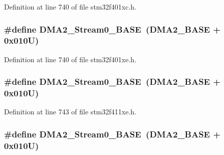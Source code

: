 Definition at line 740 of file stm32f401xc.\+h.

\subsubsection[{\texorpdfstring{D\+M\+A2\+\_\+\+Stream0\+\_\+\+B\+A\+SE}{DMA2_Stream0_BASE}}]{\setlength{\rightskip}{0pt plus 5cm}\#define D\+M\+A2\+\_\+\+Stream0\+\_\+\+B\+A\+SE~({\bf D\+M\+A2\+\_\+\+B\+A\+SE} + 0x010\+U)}\hypertarget{group___peripheral__registers__structures_gac4c67b24726ba6b94d03adb351bcec4d}{}\label{group___peripheral__registers__structures_gac4c67b24726ba6b94d03adb351bcec4d}


Definition at line 740 of file stm32f401xe.\+h.

\subsubsection[{\texorpdfstring{D\+M\+A2\+\_\+\+Stream0\+\_\+\+B\+A\+SE}{DMA2_Stream0_BASE}}]{\setlength{\rightskip}{0pt plus 5cm}\#define D\+M\+A2\+\_\+\+Stream0\+\_\+\+B\+A\+SE~({\bf D\+M\+A2\+\_\+\+B\+A\+SE} + 0x010\+U)}\hypertarget{group___peripheral__registers__structures_gac4c67b24726ba6b94d03adb351bcec4d}{}\label{group___peripheral__registers__structures_gac4c67b24726ba6b94d03adb351bcec4d}


Definition at line 743 of file stm32f411xe.\+h.

\subsubsection[{\texorpdfstring{D\+M\+A2\+\_\+\+Stream0\+\_\+\+B\+A\+SE}{DMA2_Stream0_BASE}}]{\setlength{\rightskip}{0pt plus 5cm}\#define D\+M\+A2\+\_\+\+Stream0\+\_\+\+B\+A\+SE~({\bf D\+M\+A2\+\_\+\+B\+A\+SE} + 0x010\+U)}\hypertarget{group___peripheral__registers__structures_gac4c67b24726ba6b94d03adb351bcec4d}{}\label{group___peripheral__registers__structures_gac4c67b24726ba6b94d03adb351bcec4d}


